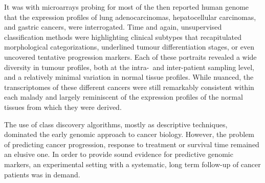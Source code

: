 It was with microarrays probing for most of the then reported human genome that
the expression profiles of lung adenocarcinomas\cite{garber_diversity_2001},
hepatocellular carcinomas,\cite{chen_gene_2002} and gastric
cancers,\cite{leung_phospholipase_2002} were interrogated.  Time and again,
unsupervised classification methods were highlighting clinical subtypes that
recapitulated morphological categorizations, underlined tumour differentiation
stages, or even uncovered tentative progression markers.  Each of these
portraits revealed a wide diversity in tumour profiles, both at the \mbox{intra-
  and} \mbox{inter-patient} sampling level, and a relatively minimal variation
in normal tissue profiles.  While nuanced, the transcriptomes of these different
cancers were still remarkably consistent within each malady and largely
reminiscent of the expression profiles of the normal tissues from which they
were derived.\cite{botstein_genomic_2003}

The use of class discovery algorithms, mostly as descriptive techniques,
dominated the early genomic approach to cancer
biology.\cite{matros_genomic_2004,eschrich_dna_2004} However, the problem of
predicting cancer progression, response to treatment or survival time remained
an elusive one.  In order to provide sound evidence for predictive genomic
markers, an experimental setting with a systematic, long term follow-up of
cancer patients was in demand.

\medskip




